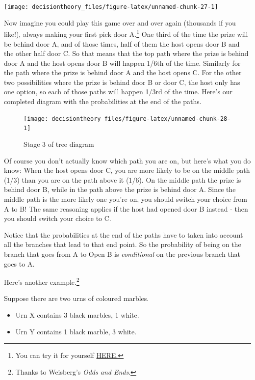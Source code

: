 \documentclass[]{tufte-book}
\providecommand{\tightlist}{%
  \setlength{\itemsep}{0pt}\setlength{\parskip}{0pt}}
\begin{document}
\begin{marginfigure}
\texttt{[image: decisiontheory\_files/figure-latex/unnamed-chunk-27-1]} \caption[Stage 2 of tree diagram]{Stage 2 of tree diagram}\label{fig:unnamed-chunk-27}
\end{marginfigure}

Now imagine you could play this game over and over again (thousands if you like!), always making your first pick door A.\footnote{You can try it for yourself \href{http://www.rossmanchance.com/applets/2021/montyhall/Monty.html}{HERE.}} One third of the time the prize will be behind door A, and of those times, half of them the host opens door B and the other half door C. So that means that the top path where the prize is behind door A and the host opens door B will happen 1/6th of the time. Similarly for the path where the prize is behind door A and the host opens C. For the other two possibilities where the prize is behind door B or door C, the host only has one option, so each of those paths will happen 1/3rd of the time. Here's our completed diagram with the probabilities at the end of the paths.

\begin{figure}
\texttt{[image: decisiontheory\_files/figure-latex/unnamed-chunk-28-1]} \caption[Stage 3 of tree diagram]{Stage 3 of tree diagram}\label{fig:unnamed-chunk-28}
\end{figure}

Of course you don't actually know which path you are on, but here's what you do know: When the host opens door C, you are more likely to be on the middle path (1/3) than you are on the path above it (1/6). On the middle path the prize is behind door B, while in the path above the prize is behind door A. Since the middle path is the more likely one you're on, you should switch your choice from A to B! The same reasoning applies if the host had opened door B instead - then you should switch your choice to C.

Notice that the probabilities at the end of the paths have to taken into account all the branches that lead to that end point. So the probability of being on the branch that goes from A to Open B is \emph{conditional} on the previous branch that goes to A.

Here's another example.\footnote{Thanks to Weisberg's \emph{Odds and Ends}.}

Suppose there are two urns of coloured marbles.

\begin{itemize}
\tightlist
\item
  Urn X contains 3 black marbles, 1 white.
\item
  Urn Y contains 1 black marble, 3 white.
\end{itemize}
\end{document}
